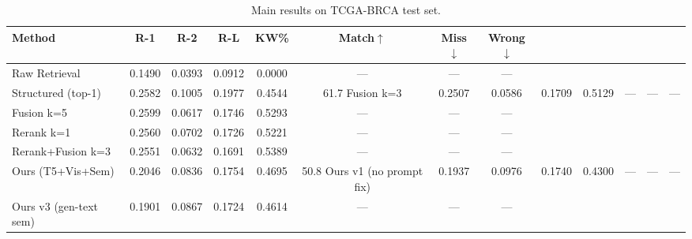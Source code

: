 \begin{table}[t]
\centering
\caption{Main results on TCGA-BRCA test set.}
\label{tab:main_results}
\begin{tabular}{lcccc|ccc}
\toprule
Method & R-1 & R-2 & R-L & KW\% & Match$\uparrow$ & Miss$\downarrow$ & Wrong$\downarrow$ \\
\midrule
Raw Retrieval & 0.1490 & 0.0393 & 0.0912 & 0.0000 & — & — & — \\
Structured (top-1) & 0.2582 & 0.1005 & 0.1977 & 0.4544 & 61.7%
Fusion k=3 & 0.2507 & 0.0586 & 0.1709 & 0.5129 & — & — & — \\
Fusion k=5 & 0.2599 & 0.0617 & 0.1746 & 0.5293 & — & — & — \\
Rerank k=1 & 0.2560 & 0.0702 & 0.1726 & 0.5221 & — & — & — \\
Rerank+Fusion k=3 & 0.2551 & 0.0632 & 0.1691 & 0.5389 & — & — & — \\
Ours (T5+Vis+Sem) & 0.2046 & 0.0836 & 0.1754 & 0.4695 & 50.8%
Ours v1 (no prompt fix) & 0.1937 & 0.0976 & 0.1740 & 0.4300 & — & — & — \\
Ours v3 (gen-text sem) & 0.1901 & 0.0867 & 0.1724 & 0.4614 & — & — & — \\
\bottomrule
\end{tabular}
\end{table}

